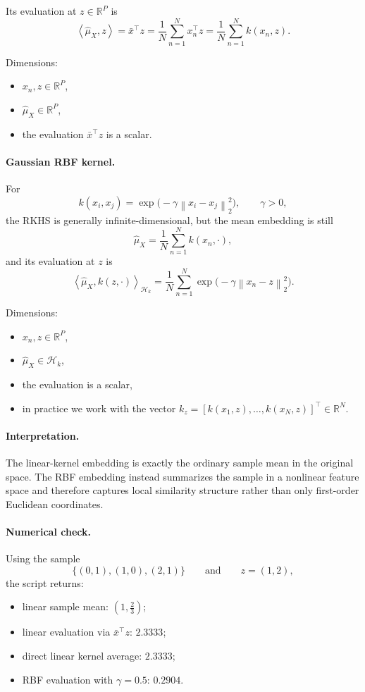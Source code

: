 \documentclass[11pt]{article}
\newcommand{\R}{\mathbb{R}}
\newcommand{\norm}[1]{\left\lVert #1 \right\rVert}
\newcommand{\inner}[2]{\left\langle #1, #2 \right\rangle}
\newcommand{\transpose}{^{\top}}
\begin{document}
Its evaluation at $z \in \R^P$ is
\[
\inner{\widehat{\mu}_X}{z}
=
\bar{x}\transpose z
=
\frac{1}{N}\sum_{n=1}^N x_n\transpose z
=
\frac{1}{N}\sum_{n=1}^N k(x_n,z).
\]

Dimensions:
\begin{itemize}
\item $x_n, z \in \R^P$,
\item $\widehat{\mu}_X \in \R^P$,
\item the evaluation $\bar{x}\transpose z$ is a scalar.
\end{itemize}

\paragraph{Gaussian RBF kernel.}
For
\[
k(x_i,x_j) = \exp\bigl(-\gamma \norm{x_i-x_j}_2^2\bigr),
\qquad
\gamma > 0,
\]
the RKHS is generally infinite-dimensional, but the mean embedding is still
\[
\widehat{\mu}_X = \frac{1}{N}\sum_{n=1}^N k(x_n,\cdot),
\]
and its evaluation at $z$ is
\[
\inner{\widehat{\mu}_X}{k(z,\cdot)}_{\mathcal{H}_k}
=
\frac{1}{N}\sum_{n=1}^N \exp\bigl(-\gamma \norm{x_n-z}_2^2\bigr).
\]

Dimensions:
\begin{itemize}
\item $x_n, z \in \R^P$,
\item $\widehat{\mu}_X \in \mathcal{H}_k$,
\item the evaluation is a scalar,
\item in practice we work with the vector $k_z = [k(x_1,z), \dots, k(x_N,z)]\transpose \in \R^N$.
\end{itemize}

\paragraph{Interpretation.}
The linear-kernel embedding is exactly the ordinary sample mean in the original space. The RBF embedding instead summarizes the sample in a nonlinear feature space and therefore captures local similarity structure rather than only first-order Euclidean coordinates.

\paragraph{Numerical check.}
Using the sample
\[
\{(0,1), (1,0), (2,1)\}
\qquad
\text{and}
\qquad
z=(1,2),
\]
the script returns:
\begin{itemize}
\item linear sample mean: $(1,\tfrac{2}{3})$;
\item linear evaluation via $\bar{x}\transpose z$: $2.3333$;
\item direct linear kernel average: $2.3333$;
\item RBF evaluation with $\gamma = 0.5$: $0.2904$.
\end{itemize}
\end{document}
